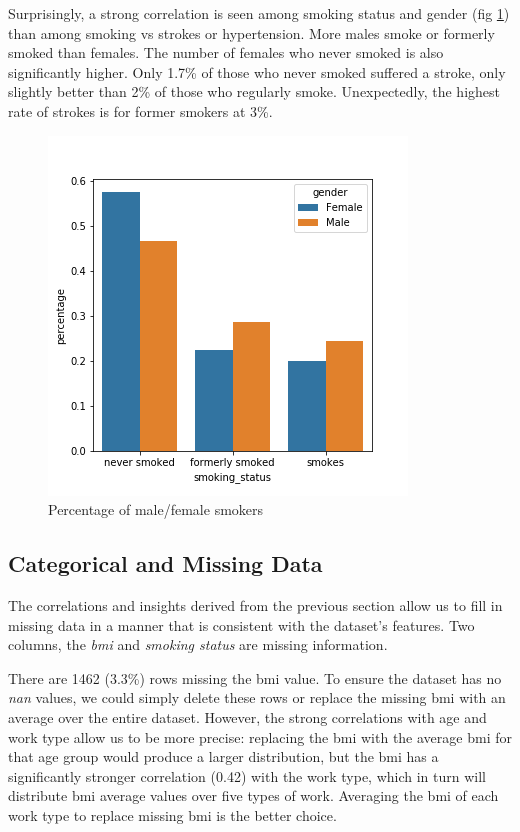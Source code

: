 \documentclass[proposal]{softeng}
\begin{document}
Surprisingly, a strong correlation is seen among smoking status and gender (fig \ref{fig:gender_smoking_percentage}) than among smoking vs strokes or hypertension. More males smoke or formerly smoked than females. The number of females who never smoked is also significantly higher. Only 1.7\% of those who never smoked suffered a stroke, only slightly better than 2\% of those who regularly smoke. Unexpectedly, the highest rate of strokes is for former smokers at 3\%.

\begin{figure}[h!]
\centering

\includegraphics[width=.4\textwidth]{images/building_ann/gender_smoking_percentage.png}

\caption{Percentage of male/female smokers}

\label{fig:gender_smoking_percentage}
\end{figure}

\subsection{Categorical and Missing Data}
The correlations and insights derived from the previous section allow us to fill in missing data in a manner that is consistent with the dataset's features. Two columns, the \textit{bmi} and \textit{smoking status} are missing information.

There are 1462 (3.3\%) rows missing the bmi value. To ensure the dataset has no \textit{nan} values, we could simply delete these rows or replace the missing bmi with an average over the entire dataset. However, the strong correlations with age and work type allow us to be more precise: replacing the bmi with the average bmi for that age group would produce a larger distribution, but the bmi has a significantly stronger correlation (0.42) with the work type, which in turn will distribute bmi average values over five types of work. Averaging the bmi of each work type to replace missing bmi is the better choice.
\end{document}
